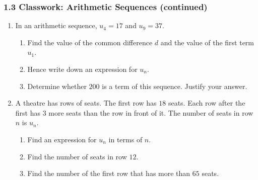 \documentclass[12pt, twoside]{article}
\begin{document}
\subsubsection*{1.3 Classwork: Arithmetic Sequences (continued)}

\begin{enumerate}[itemsep=0.15cm]


\item[1.]

In an arithmetic sequence, $u_{4} = 17$ and $u_{9} = 37$.

\begin{enumerate}[itemsep=0.1cm]
  \item Find the value of the common difference $d$ and the value of
  the first term $u_{1}$.
  \item Hence write down an expression for $u_{n}$.
  \item Determine whether $200$ is a term of this sequence. Justify
  your answer.
\end{enumerate}


\newpage

\item[2.]

A theatre has rows of seats. The first row has $18$ seats. Each row
after the first has $3$ more seats than the row in front of it. The
number of seats in row $n$ is $u_{n}$.

\begin{enumerate}[itemsep=0.1cm]
  \item Find an expression for $u_{n}$ in terms of $n$.
  \item Find the number of seats in row $12$.
  \item Find the number of the first row that has more than $65$
  seats.
\end{enumerate}


\end{enumerate}
\end{document}
